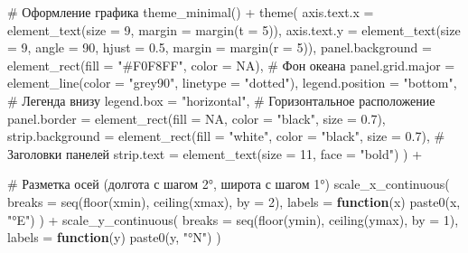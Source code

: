 \documentclass[
  letterpaper,
  DIV=11,
  numbers=noendperiod]{scrreprt}
\newenvironment{Shaded}{\begin{snugshade}}{\end{snugshade}}
\newcommand{\AttributeTok}[1]{\textcolor[rgb]{0.40,0.45,0.13}{#1}}
\newcommand{\CommentTok}[1]{\textcolor[rgb]{0.37,0.37,0.37}{#1}}
\newcommand{\ConstantTok}[1]{\textcolor[rgb]{0.56,0.35,0.01}{#1}}
\newcommand{\ControlFlowTok}[1]{\textcolor[rgb]{0.00,0.23,0.31}{\textbf{#1}}}
\newcommand{\DecValTok}[1]{\textcolor[rgb]{0.68,0.00,0.00}{#1}}
\newcommand{\FloatTok}[1]{\textcolor[rgb]{0.68,0.00,0.00}{#1}}
\newcommand{\FunctionTok}[1]{\textcolor[rgb]{0.28,0.35,0.67}{#1}}
\newcommand{\NormalTok}[1]{\textcolor[rgb]{0.00,0.23,0.31}{#1}}
\newcommand{\SpecialCharTok}[1]{\textcolor[rgb]{0.37,0.37,0.37}{#1}}
\newcommand{\StringTok}[1]{\textcolor[rgb]{0.13,0.47,0.30}{#1}}
\begin{document}
\begin{Shaded}
\begin{Highlighting}[]
  \CommentTok{\# Оформление графика}
  \FunctionTok{theme\_minimal}\NormalTok{() }\SpecialCharTok{+}
  \FunctionTok{theme}\NormalTok{(}
    \AttributeTok{axis.text.x =} \FunctionTok{element\_text}\NormalTok{(}\AttributeTok{size =} \DecValTok{9}\NormalTok{, }\AttributeTok{margin =} \FunctionTok{margin}\NormalTok{(}\AttributeTok{t =} \DecValTok{5}\NormalTok{)),}
    \AttributeTok{axis.text.y =} \FunctionTok{element\_text}\NormalTok{(}\AttributeTok{size =} \DecValTok{9}\NormalTok{, }\AttributeTok{angle =} \DecValTok{90}\NormalTok{, }\AttributeTok{hjust =} \FloatTok{0.5}\NormalTok{, }\AttributeTok{margin =} \FunctionTok{margin}\NormalTok{(}\AttributeTok{r =} \DecValTok{5}\NormalTok{)),}
    \AttributeTok{panel.background =} \FunctionTok{element\_rect}\NormalTok{(}\AttributeTok{fill =} \StringTok{"\#F0F8FF"}\NormalTok{, }\AttributeTok{color =} \ConstantTok{NA}\NormalTok{),  }\CommentTok{\# Фон океана}
    \AttributeTok{panel.grid.major =} \FunctionTok{element\_line}\NormalTok{(}\AttributeTok{color =} \StringTok{"grey90"}\NormalTok{, }\AttributeTok{linetype =} \StringTok{"dotted"}\NormalTok{),}
    \AttributeTok{legend.position =} \StringTok{"bottom"}\NormalTok{,           }\CommentTok{\# Легенда внизу}
    \AttributeTok{legend.box =} \StringTok{"horizontal"}\NormalTok{,            }\CommentTok{\# Горизонтальное расположение}
    \AttributeTok{panel.border =} \FunctionTok{element\_rect}\NormalTok{(}\AttributeTok{fill =} \ConstantTok{NA}\NormalTok{, }\AttributeTok{color =} \StringTok{"black"}\NormalTok{, }\AttributeTok{size =} \FloatTok{0.7}\NormalTok{),}
    \AttributeTok{strip.background =} \FunctionTok{element\_rect}\NormalTok{(}\AttributeTok{fill =} \StringTok{"white"}\NormalTok{, }\AttributeTok{color =} \StringTok{"black"}\NormalTok{, }\AttributeTok{size =} \FloatTok{0.7}\NormalTok{),  }\CommentTok{\# Заголовки панелей}
    \AttributeTok{strip.text =} \FunctionTok{element\_text}\NormalTok{(}\AttributeTok{size =} \DecValTok{11}\NormalTok{, }\AttributeTok{face =} \StringTok{"bold"}\NormalTok{)}
\NormalTok{  ) }\SpecialCharTok{+}
  
  \CommentTok{\# Разметка осей (долгота с шагом 2°, широта с шагом 1°)}
  \FunctionTok{scale\_x\_continuous}\NormalTok{(}
    \AttributeTok{breaks =} \FunctionTok{seq}\NormalTok{(}\FunctionTok{floor}\NormalTok{(xmin), }\FunctionTok{ceiling}\NormalTok{(xmax), }\AttributeTok{by =} \DecValTok{2}\NormalTok{),}
    \AttributeTok{labels =} \ControlFlowTok{function}\NormalTok{(x) }\FunctionTok{paste0}\NormalTok{(x, }\StringTok{"°E"}\NormalTok{)}
\NormalTok{  ) }\SpecialCharTok{+}
  \FunctionTok{scale\_y\_continuous}\NormalTok{(}
    \AttributeTok{breaks =} \FunctionTok{seq}\NormalTok{(}\FunctionTok{floor}\NormalTok{(ymin), }\FunctionTok{ceiling}\NormalTok{(ymax), }\AttributeTok{by =} \DecValTok{1}\NormalTok{),  }
    \AttributeTok{labels =} \ControlFlowTok{function}\NormalTok{(y) }\FunctionTok{paste0}\NormalTok{(y, }\StringTok{"°N"}\NormalTok{)}
\NormalTok{  )}
\end{Highlighting}
\end{Shaded}
\end{document}
